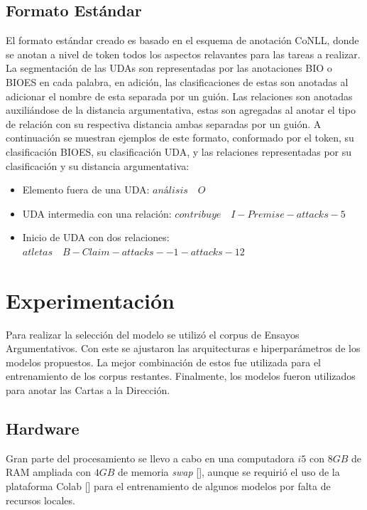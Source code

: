 \subsection{Formato Estándar}

El formato estándar creado es basado en el esquema de anotación CoNLL, donde se anotan a nivel de token todos los aspectos 
relavantes para las tareas a realizar. La segmentación de las UDAs son representadas por las anotaciones 
BIO o BIOES en cada palabra, en adición, las clasificaciones de estas son anotadas al adicionar el nombre 
de esta separada por un guión. Las relaciones son anotadas auxiliándose de la distancia argumentativa, estas 
son agregadas al anotar el tipo de relación con su respectiva distancia ambas separadas por un guión. A 
continuación se muestran ejemplos de este formato, conformado por el token, su clasificación BIOES, su clasificación
UDA, y las relaciones representadas por su clasificación y su distancia argumentativa:

\begin{itemize}
	\item Elemento fuera de una UDA: $análisis \quad O$
	\item UDA intermedia con una relación: $contribuye \quad I-Premise-attacks-5$
	\item Inicio de UDA con dos relaciones: $atletas \quad B-Claim-attacks--1-attacks-12$
\end{itemize}

\section{Experimentación}

Para realizar la selección del modelo se utilizó el corpus de Ensayos Argumentativos. Con este se ajustaron
las arquitecturas e hiperparámetros de los modelos propuestos. La mejor combinación de estos fue utilizada 
para el entrenamiento de los corpus restantes. Finalmente, los modelos fueron utilizados para anotar las Cartas 
a la Dirección. 

\subsection{Hardware}

Gran parte del procesamiento se llevo a cabo en una computadora $i5$ con $8GB$ de RAM ampliada con $4GB$ de memoria 
\emph{swap} [\cite{swap}], aunque se requirió el uso de la plataforma Colab [\cite{colab}] para 
el entrenamiento de algunos modelos por falta de recursos locales.

